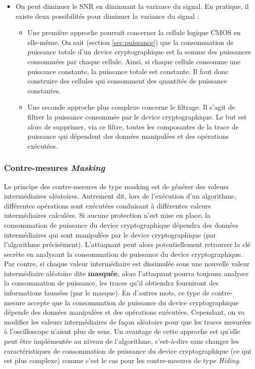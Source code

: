 \documentclass[10pt, oneside, a4paper]{article}
\begin{document}
\begin{itemize}
\begin{itemize}
\item On peut diminuer le SNR en diminuant la variance du signal. En pratique, il existe deux possibilités pour diminuer la variance du signal :
\begin{itemize}
\item Une première approche pourrait concerner la cellule logique CMOS en elle-même. On sait (section \ref{sec:puissance}) que la consommation de puissance totale d'un device cryptographique est la somme des puissances consommées par chaque cellule. Ainsi, si chaque cellule consomme une puissance constante, la puissance totale est constante. Il faut donc construire des cellules qui consomment des quantités de puissance constantes.
\item Une seconde approche plus complexe concerne le filtrage. Il s'agit de filtrer la puissance consommée par le device cryptographique. Le but est alors de supprimer, via ce filtre, toutes les composantes de la trace de puissance qui dépendent des données manipulées et des opérations exécutées. 
\end{itemize}
\end{itemize}
\end{itemize}







\subsubsection{Contre-mesures \textit{Masking}}
Le principe des contre-mesures de type masking est de générer des valeurs intermédiaires aléatoires. Autrement dit, lors de l'exécution d'un algorithme, différentes opérations sont exécutées conduisant à différentes valeurs intermédiaires calculées. Si aucune protection n'est mise en place, la consommation de puissance du device cryptographique dépendra des données intermédiaires qui sont manipulées par le device cryptographique (par l'algorithme précisément). L'attaquant peut alors potentiellement retrouver la clé secrète en analysant la consommation de puissance du device cryptographique. Par contre, si chaque valeur intermédiaire est dissimulée sous une nouvelle valeur intermédiaire aléatoire dite \textbf{masquée}, alors l'attaquant pourra toujours analyser la consommation de puissance, les traces qu'il obtiendra fourniront des informations faussées (par le masque). En d'autres mots, ce type de contre-mesure accepte que la consommation de puissance du device cryptographique dépende des données manipulées et des opérations exécutées. Cependant, on va modifier les valeurs intermédiaires de façon aléatoire pour que les traces mesurées à l'oscilloscope n'aient plus de sens. Un avantage de cette approche est qu'elle peut être implémentée au niveau de l'algorithme, c'est-à-dire sans changer les caractéristiques de consommation de puissance du device cryptographique (ce qui est plus complexe) comme c'est le cas pour les contre-mesures de type \textit{Hiding}.
\end{document}
